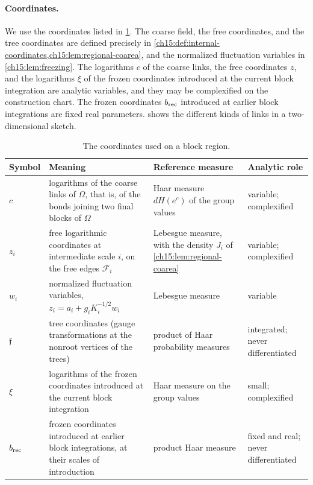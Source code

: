 \paragraph{Coordinates.}
We use the coordinates listed in \cref{ch15:tab:coordinates}. The coarse field, the free coordinates, and the tree coordinates are defined precisely in \cref{ch15:def:internal-coordinates,ch15:lem:regional-coarea}, and the normalized fluctuation variables in \cref{ch15:lem:freezing}. The logarithms $c$ of the coarse links, the free coordinates $z$, and the logarithms $\xi$ of the frozen coordinates introduced at the current block integration are analytic variables, and they may be complexified on the construction chart. The frozen coordinates $b_{\mathrm{rec}}$ introduced at earlier block integrations are fixed real parameters.  shows the different kinds of links in a two-dimensional sketch.

\begin{table}[ht]
\centering\small
\renewcommand{\arraystretch}{1.15}
\begin{tabular}{@{}>{\raggedright}p{1.35cm}>{\raggedright}p{5.05cm}>{\raggedright}p{3.6cm}>{\raggedright\arraybackslash}p{3.4cm}@{}}
\toprule
Symbol & Meaning & Reference measure & Analytic role\\
\midrule
$c$ & logarithms of the coarse links of $\Omega$, that is, of the bonds joining two final blocks of $\Omega$ & Haar measure $dH(e^c)$ of the group values & variable; complexified\\
$z_i$ & free logarithmic coordinates at intermediate scale $i$, on the free edges $\mathcal F_i$ & Lebesgue measure, with the density $J_i$ of \cref{ch15:lem:regional-coarea} & variable; complexified\\
$w_i$ & normalized fluctuation variables, $z_i=a_i+g_iK_i^{-1/2}w_i$ & Lebesgue measure & variable\\
$\mathfrak f$ & tree coordinates (gauge transformations at the nonroot vertices of the trees) & product of Haar probability measures & integrated; never differentiated\\
$\xi$ & logarithms of the frozen coordinates introduced at the current block integration & Haar measure on the group values & small; complexified\\
$b_{\mathrm{rec}}$ & frozen coordinates introduced at earlier block integrations, at their scales of introduction & product Haar measure & fixed and real; never differentiated\\
\bottomrule
\end{tabular}
\caption{The coordinates used on a block region.}
\label{ch15:tab:coordinates}
\end{table}

